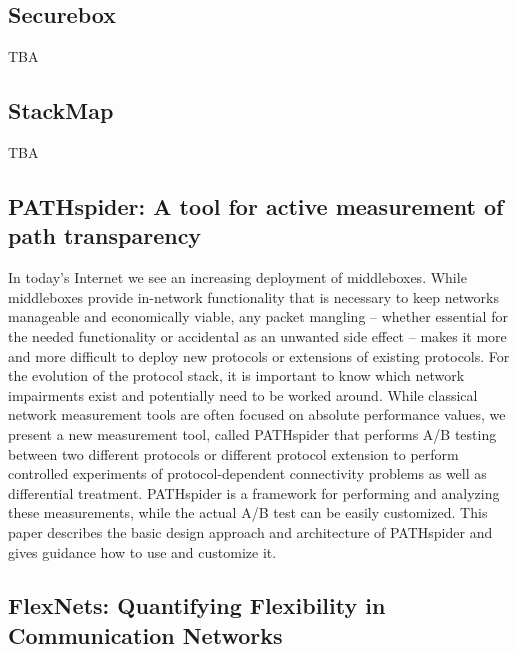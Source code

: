 \subsection{Securebox}

TBA

\subsection{StackMap}

TBA

\subsection{PATHspider: A tool for active measurement of path transparency}

In today’s Internet we see an increasing deployment of middleboxes. While 
middleboxes provide in-network functionality that is necessary to keep 
networks manageable and economically viable, any packet mangling – whether 
essential for the needed functionality or accidental as an unwanted side 
effect – makes it more and more difficult to deploy new protocols or 
extensions of existing protocols. For the evolution of the protocol stack, 
it is important to know which network impairments exist and potentially 
need to be worked around. While classical network measurement tools are 
often focused on absolute performance values, we present a new measurement 
tool, called PATHspider that performs A/B testing between two different 
protocols or different protocol extension to perform controlled experiments 
of protocol-dependent connectivity problems as well as differential treatment. 
PATHspider is a framework for performing and analyzing these measurements, 
while the actual A/B test can be easily customized. This paper describes the 
basic design approach and architecture of PATHspider and gives guidance how 
to use and customize it.

\subsection{FlexNets: Quantifying Flexibility in Communication Networks}

